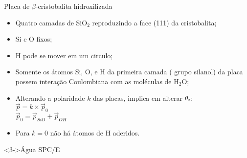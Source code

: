 \documentclass[8pt]{beamer}
\begin{document}
\begin{frame}
\begin{block}{Placa de $\beta$-cristobalita hidroxilizada}
\begin{minipage}{0.21\textwidth}
  
				\end{minipage}
				\begin{minipage}{0.265\textwidth}
   				 	\begin{itemize}
   				 		\item<2-> \scriptsize Quatro camadas de SiO$_2$ reproduzindo a face (111) da cristobalita;
   				     	\item<2-> \scriptsize Si e O fixos;
   				 		\item<2-> \scriptsize H pode se mover em um circulo;
   				 	\end{itemize} 	
				 \end{minipage}
				 \begin{minipage}{0.265\textwidth}
   				 	\begin{itemize}				
						\item<2-> \scriptsize Somente os átomos Si, O, e H da primeira camada ({\color{red} grupo silanol}) da placa possem interação Coulombiana com as moléculas de H$_2$O;
						\item<2-> \scriptsize Alterando a polaridade $k$ das placas, implica em alterar $\theta_{\rm c}$:\\
						$\overrightarrow{p} = k\times \overrightarrow{p}_{0}$\\
						$\overrightarrow{p}_0 = \overrightarrow{p}_{SiO} + \overrightarrow{p}_{OH}$\\
						\item<2-> \scriptsize Para $k=0$ não há átomos de H aderidos.
					\end{itemize} 	
				\end{minipage}
		\end{block}
		\vspace{-0.15cm}
		\begin{minipage}{0.165\textwidth}
			\begin{block}<3->{Água SPC/E}
				\begin{center}

\end{center}
\end{block}
\end{minipage}
\end{frame}
\end{document}
